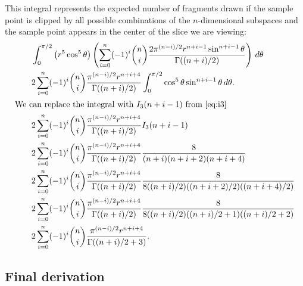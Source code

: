 \begin{lem}

This integral represents the expected number of fragments drawn if the sample
point is clipped by all possible combinations of the $n$-dimensional 
subspaces and the sample point appears in the center of the slice we are 
viewing:
\begin{align*}
  \qquad & \int_{0}^{\pi/2}
           \left(r^5 \cos^5 \theta\right)
           \left(
             \sum_{i=0}^{n} (-1)^i {n \choose i}
                            \frac{2\pi^{(n-i)/2} r^{n+i-1} \sin^{n+i-1} \theta}
                                 {\Gamma((n+i)/2)} 
           \right) \, d\theta \\
  \qquad & 2 \sum_{i=0}^{n} (-1)^i {n \choose i}
                            \frac{\pi^{(n-i)/2} r^{n+i+4}}
                                 {\Gamma((n+i)/2)} 
           \int_{0}^{\pi/2} \cos^5 \theta \sin^{n+i-1} \theta \, d\theta \text{.}\\
\intertext{We can replace the integral with $I_3(n+i-1)$ from \autoref{eq:i3}}
  \qquad & 2 \sum_{i=0}^{n} (-1)^i {n \choose i}
                            \frac{\pi^{(n-i)/2} r^{n+i+4}}
                                 {\Gamma((n+i)/2)} 
           I_3(n+i-1) \\
   \qquad & 2 \sum_{i=0}^{n} (-1)^i {n \choose i}
                            \frac{\pi^{(n-i)/2} r^{n+i+4}}
                                 {\Gamma((n+i)/2)} 
           \frac{8}{(n+i)(n+i+2)(n+i+4)} \\
   \qquad & 2 \sum_{i=0}^{n} (-1)^i {n \choose i}
                            \frac{\pi^{(n-i)/2} r^{n+i+4}}
                                 {\Gamma((n+i)/2)} 
           \frac{8}{8((n+i)/2)((n+i+2)/2)((n+i+4)/2)} \\
   \qquad & 2 \sum_{i=0}^{n} (-1)^i {n \choose i}
                            \frac{\pi^{(n-i)/2} r^{n+i+4}}
                                 {\Gamma((n+i)/2)} 
           \frac{8}{8((n+i)/2)((n+i)/2+1)((n+i)/2+2)} \\
   \qquad & 2 \sum_{i=0}^{n}(-1)^i {n \choose i}
                            \frac{\pi^{(n-i)/2} r^{n+i+4}}
                                 {\Gamma((n+i)/2+3)}
\text{.}
\end{align*}
\end{lem}

\subsection{Final derivation}

